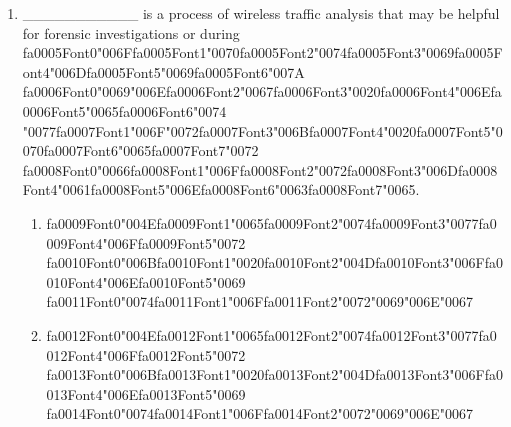 \documentclass[12pt]{article}
\begin{document}
\begin{enumerate}[label=\arabic*.]
\item \_\_\_\_\_\_\_\_\_\_\_ is a process of wireless traffic analysis that may be helpful for forensic investigations or during {\csname fa0005Font0\endcsname\char"006F}{\csname fa0005Font1\endcsname\char"0070}{\csname fa0005Font2\endcsname\char"0074}{\csname fa0005Font3\endcsname\char"0069}{\csname fa0005Font4\endcsname\char"006D}{\csname fa0005Font5\endcsname\char"0069}{\csname fa0005Font6\endcsname\char"007A} {\csname fa0006Font0\endcsname\char"0069}{\char"006E}{\csname fa0006Font2\endcsname\char"0067}{\csname fa0006Font3\endcsname\char"0020}{\csname fa0006Font4\endcsname\char"006E}{\csname fa0006Font5\endcsname\char"0065}{\csname fa0006Font6\endcsname\char"0074} {\char"0077}{\csname fa0007Font1\endcsname\char"006F}{\char"0072}{\csname fa0007Font3\endcsname\char"006B}{\csname fa0007Font4\endcsname\char"0020}{\csname fa0007Font5\endcsname\char"0070}{\csname fa0007Font6\endcsname\char"0065}{\csname fa0007Font7\endcsname\char"0072} {\csname fa0008Font0\endcsname\char"0066}{\csname fa0008Font1\endcsname\char"006F}{\csname fa0008Font2\endcsname\char"0072}{\csname fa0008Font3\endcsname\char"006D}{\csname fa0008Font4\endcsname\char"0061}{\csname fa0008Font5\endcsname\char"006E}{\csname fa0008Font6\endcsname\char"0063}{\csname fa0008Font7\endcsname\char"0065}.
\begin{enumerate}[label=(\alph*)]
    \item {\csname fa0009Font0\endcsname\char"004E}{\csname fa0009Font1\endcsname\char"0065}{\csname fa0009Font2\endcsname\char"0074}{\csname fa0009Font3\endcsname\char"0077}{\csname fa0009Font4\endcsname\char"006F}{\csname fa0009Font5\endcsname\char"0072} {\csname fa0010Font0\endcsname\char"006B}{\csname fa0010Font1\endcsname\char"0020}{\csname fa0010Font2\endcsname\char"004D}{\csname fa0010Font3\endcsname\char"006F}{\csname fa0010Font4\endcsname\char"006E}{\csname fa0010Font5\endcsname\char"0069} {\csname fa0011Font0\endcsname\char"0074}{\csname fa0011Font1\endcsname\char"006F}{\csname fa0011Font2\endcsname\char"0072}{\char"0069}{\char"006E}{\char"0067}
    \item {\csname fa0012Font0\endcsname\char"004E}{\csname fa0012Font1\endcsname\char"0065}{\csname fa0012Font2\endcsname\char"0074}{\csname fa0012Font3\endcsname\char"0077}{\csname fa0012Font4\endcsname\char"006F}{\csname fa0012Font5\endcsname\char"0072} {\csname fa0013Font0\endcsname\char"006B}{\csname fa0013Font1\endcsname\char"0020}{\csname fa0013Font2\endcsname\char"004D}{\csname fa0013Font3\endcsname\char"006F}{\csname fa0013Font4\endcsname\char"006E}{\csname fa0013Font5\endcsname\char"0069} {\csname fa0014Font0\endcsname\char"0074}{\csname fa0014Font1\endcsname\char"006F}{\csname fa0014Font2\endcsname\char"0072}{\char"0069}{\char"006E}{\char"0067}

\end{enumerate}
\end{enumerate}
\end{document}
